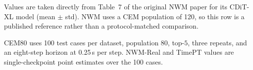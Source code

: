 \begin{table}[t]
\begin{threeparttable}
\begin{tablenotes}[flushleft]
      \item[a] Values are taken directly from Table~7 of the original NWM paper
      for its CDiT-XL model (mean $\pm$ std). NWM uses a CEM population of 120,
      so this row is a published reference rather than a protocol-matched
      comparison.
      \item CEM80 uses 100 test cases per dataset, population 80, top-$5$,
      three repeats, and an eight-step horizon at 0.25\,s per step.
      NWM-Real and TimePT values are single-checkpoint point estimates over the
      100 cases.
    \end{tablenotes}
  \end{threeparttable}
\end{table}
